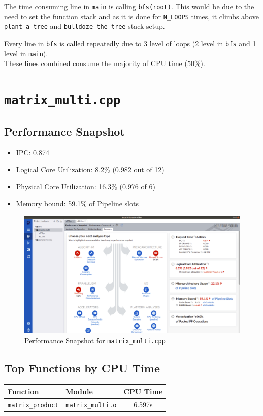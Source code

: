 \documentclass[11pt, swedish, openany]{book}
\begin{document}
The time consuming line in \texttt{main} is calling \texttt{bfs(root)}. This would be due to the need to set the function stack and as it is done for \texttt{N\_LOOPS} times, it climbs above \texttt{plant\_a\_tree} and \texttt{bulldoze\_the\_tree} stack setup.

Every line in \texttt{bfs} is called repeatedly due to 3 level of loops (2 level in \texttt{bfs} and 1 level in \texttt{main}). \\
These lines combined consume the majority of CPU time (\~50\%).


\newpage
\section{\texttt{matrix\_multi.cpp}}

\subsection*{Performance Snapshot}
\begin{itemize}
    \item IPC: 0.874
    \item Logical Core Utilization: 8.2\% (0.982 out of 12)
    \item Physical Core Utilization: 16.3\% (0.976 of 6)
    \item Memory bound: 59.1\% of Pipeline slots
\end{itemize}

\begin{figure}[H]
    \centering
    \includegraphics[scale=0.25]{vtune/matrix_multi/ps.png}
    \caption{Performance Snapshot for \texttt{matrix\_multi.cpp}}
\end{figure}

\newpage
\subsection*{Top Functions by CPU Time}
\begin{table}[H]
    \begin{tabular}{||l|l||c||}
        \hline
        Function                 & Module                   & CPU Time \\
        \hline
        \texttt{matrix\_product} & \texttt{matrix\_multi.o} & 6.597s   \\
        \hline
    \end{tabular}
\end{table}
\end{document}
